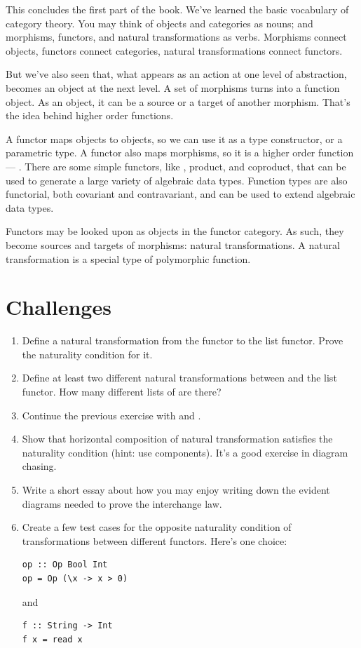 This concludes the first part of the book. We've learned the basic
vocabulary of category theory. You may think of objects and categories
as nouns; and morphisms, functors, and natural transformations as verbs.
Morphisms connect objects, functors connect categories, natural
transformations connect functors.

But we've also seen that, what appears as an action at one level of
abstraction, becomes an object at the next level. A set of morphisms
turns into a function object. As an object, it can be a source or a
target of another morphism. That's the idea behind higher order
functions.

A functor maps objects to objects, so we can use it as a type
constructor, or a parametric type. A functor also maps morphisms, so it
is a higher order function --- . There are some simple
functors, like , product, and coproduct, that can be used
to generate a large variety of algebraic data types. Function types are
also functorial, both covariant and contravariant, and can be used to
extend algebraic data types.

Functors may be looked upon as objects in the functor category. As such,
they become sources and targets of morphisms: natural transformations. A
natural transformation is a special type of polymorphic function.

\section{Challenges}\label{challenges}

\begin{enumerate}
\item
  Define a natural transformation from the  functor to the
  list functor. Prove the naturality condition for it.
\item
  Define at least two different natural transformations between
   and the list functor. How many different lists of
  \code{()} are there?
\item
  Continue the previous exercise with  and
  .
\item
  Show that horizontal composition of natural transformation satisfies
  the naturality condition (hint: use components). It's a good exercise
  in diagram chasing.
\item
  Write a short essay about how you may enjoy writing down the evident
  diagrams needed to prove the interchange law.
\item
  Create a few test cases for the opposite naturality condition of
  transformations between different  functors. Here's one
  choice:

\begin{verbatim}
op :: Op Bool Int
op = Op (\x -> x > 0)
\end{verbatim}

  and

\begin{verbatim}
f :: String -> Int
f x = read x
\end{verbatim}
\end{enumerate}

